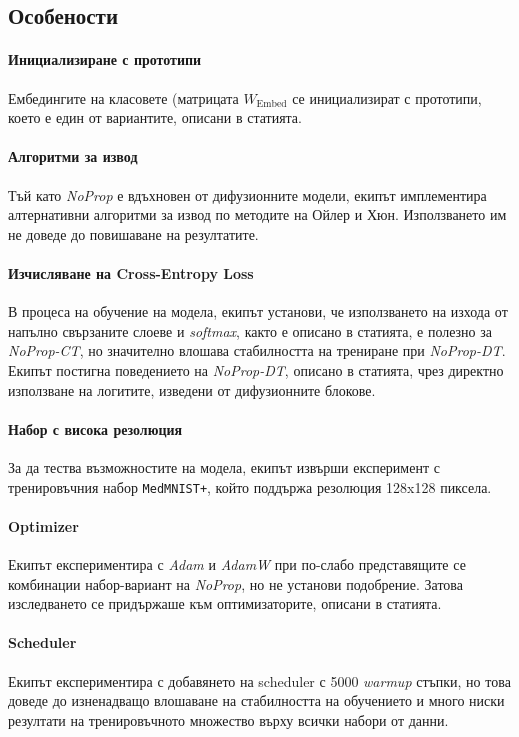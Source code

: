\documentclass[a4paper,11pt]{article}
\begin{document}
\subsection{Особености}
\paragraph{Инициализиране с прототипи}
Ембедингите на класовете (матрицата $W_\text{Embed}$ се инициализират с прототипи, което е един от вариантите, описани в статията. 

\paragraph{Алгоритми за извод}
Тъй като \emph{NoProp} е вдъхновен от дифузионните модели, екипът имплементира алтернативни алгоритми за извод по методите на Ойлер и Хюн. Използването им не доведе до повишаване на резултатите. 

\paragraph{Изчисляване на Cross-Entropy Loss}
В процеса на обучение на модела, екипът установи, че използването на изхода от напълно свързаните слоеве и \emph{softmax}, както е описано в статията, е полезно за \emph{NoProp-CT}, но значително влошава стабилността на трениране при \emph{NoProp-DT}. Екипът постигна поведението на \emph{NoProp-DT}, описано в статията, чрез директно използване на логитите, изведени от дифузионните блокове. 

\paragraph{Набор с висока резолюция}
За да тества възможностите на модела, екипът извърши експеримент с тренировъчния набор \texttt{MedMNIST+}, който поддържа резолюция 128x128 пиксела. 

\paragraph{Optimizer}
Екипът експериментира с \emph{Adam} и \emph{AdamW} при по-слабо представящите се комбинации набор-вариант на \emph{NoProp}, но не установи подобрение. Затова изследването се придържаше към оптимизаторите, описани в статията. 

\paragraph{Scheduler}
Екипът експериментира с добавянето на scheduler с 5000 \emph{warmup} стъпки, но това доведе до изненадващо влошаване на стабилността на обучението и много ниски резултати на тренировъчното множество върху всички набори от данни. 
\end{document}
